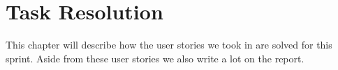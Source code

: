 \chapter{Task Resolution}\label{chap:s4task}
This chapter will describe how the user stories we took in  are solved for this sprint.
Aside from these user stories we also write a lot on the report.




